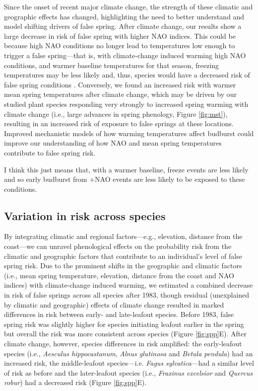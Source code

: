 \documentclass{article}\usepackage[]{graphicx}\usepackage[]{color}
\begin{document}
Since the onset of recent major climate change, the strength of these climatic and geographic effects has changed, highlighting the need to better understand and model shifting drivers of false spring. After climate change, our results show a large decrease in risk of false spring with higher NAO indices. This could be because high NAO conditions no longer lead to temperatures low enough to trigger a false spring---that is, with climate-change induced warming high NAO conditions, and warmer baseline temperatures for that season, freezing temperatures may be less likely and, thus, species would have a decreased risk of false spring conditions \citep{Screen2017}. Conversely, we found an increased risk with warmer mean spring temperatures after climate change, which may be driven by our studied plant species responding very strongly to increased spring warming with climate change (i.e., large advances in spring phenology, Figure \ref{fig:mst}), resulting in an increased risk of exposure to false springs at these locations. Improved mechanistic models of how warming temperatures affect budburst \citep{Gauzere2017,Chuine2016} could improve our understanding of how NAO and mean spring temperatures contribute to false spring risk.  

I think this just means that, with a warmer baseline, freeze events are less likely and so early budburst from +NAO events are less likely to be exposed to these conditions.

\subsection*{Variation in risk across species} 
By integrating climatic and regional factors---e.g., elevation, distance from the coast---we can unravel phenological effects on the probability risk from the climatic and geographic factors that contribute to an individual's level of false spring risk. Due to the prominent shifts in the geographic and climatic factors (i.e., mean spring temperature, elevation, distance from the coast and NAO indices) with climate-change induced warming, we estimated a combined decrease in risk of false springs across all species after 1983, though residual (unexplained by climatic and geographic) effects of climate change resulted in marked differences in risk between early- and late-leafout species. Before 1983, false spring risk was slightly higher for species initiating leafout earlier in the spring but overall the risk was more consistent across species (Figure \ref{fig:spp}E). After climate change, however, species differences in risk amplified: the early-leafout species (i.e., \textit{Aesculus hippocastanum}, \textit{Alnus glutinosa} and \textit{Betula pendula}) had an increased risk, the middle-leafout species---i.e. \textit{Fagus sylvatica}---had a similar level of risk as before and the later-leafout species (i.e., \textit{Fraxinus excelsior} and \textit{Quercus robur}) had a decreased risk (Figure \ref{fig:spp}E). 
\end{document}
